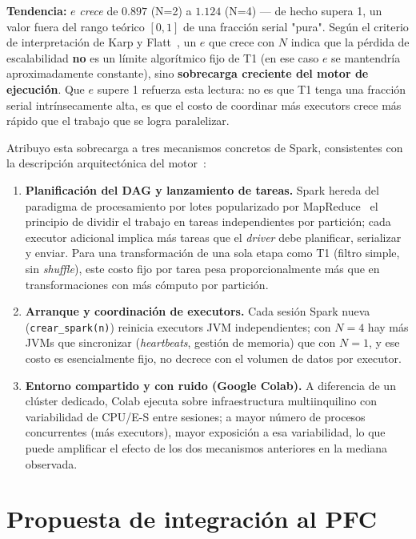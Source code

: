 \documentclass[11pt,a4paper]{article}
\begin{document}
\textbf{Tendencia:} $e$ \emph{crece} de $0.897$ (N=2) a $1.124$ (N=4) --- de hecho
supera 1, un valor fuera del rango teórico $[0,1]$ de una fracción serial
"pura". Según el criterio de interpretación de Karp y Flatt~\cite{karpflatt1990},
un $e$ que crece con $N$ indica que la pérdida de escalabilidad \textbf{no} es un
límite algorítmico fijo de T1 (en ese caso $e$ se mantendría aproximadamente
constante), sino \textbf{sobrecarga creciente del motor de ejecución}. Que $e$
supere 1 refuerza esta lectura: no es que T1 tenga una fracción serial
intrínsecamente alta, es que el costo de coordinar más executors crece más rápido
que el trabajo que se logra paralelizar.

Atribuyo esta sobrecarga a tres mecanismos concretos de Spark, consistentes con la
descripción arquitectónica del motor~\cite{zaharia2016spark}:
\begin{enumerate}
  \item \textbf{Planificación del DAG y lanzamiento de tareas.} Spark hereda del
    paradigma de procesamiento por lotes popularizado por
    MapReduce~\cite{deanghemawat2008} el principio de dividir el trabajo en
    tareas independientes por partición; cada executor adicional implica más
    tareas que el \textit{driver} debe planificar, serializar y enviar. Para
    una transformación de una sola etapa como T1 (filtro simple, sin
    \textit{shuffle}), este costo fijo por tarea pesa proporcionalmente más que
    en transformaciones con más cómputo por partición.
  \item \textbf{Arranque y coordinación de executors.} Cada sesión Spark nueva
    (\texttt{crear\_spark(n)}) reinicia executors JVM independientes; con
    $N{=}4$ hay más JVMs que sincronizar (\textit{heartbeats}, gestión de
    memoria) que con $N{=}1$, y ese costo es esencialmente fijo, no decrece con
    el volumen de datos por executor.
  \item \textbf{Entorno compartido y con ruido (Google Colab).} A diferencia de
    un clúster dedicado, Colab ejecuta sobre infraestructura multiinquilino con
    variabilidad de CPU/E-S entre sesiones; a mayor número de procesos
    concurrentes (más executors), mayor exposición a esa variabilidad, lo que
    puede amplificar el efecto de los dos mecanismos anteriores en la mediana
    observada.
\end{enumerate}

\section{Propuesta de integración al PFC}
\label{sec:propuesta}
\end{document}
